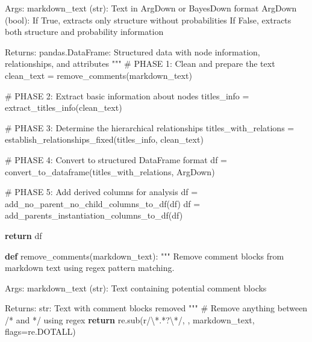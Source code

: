 \documentclass[
  11pt,
  letterpaper,
]{book}
\newenvironment{Shaded}{\begin{snugshade}}{\end{snugshade}}
\newcommand{\CharTok}[1]{\textcolor[rgb]{0.13,0.47,0.30}{#1}}
\newcommand{\CommentTok}[1]{\textcolor[rgb]{0.37,0.37,0.37}{#1}}
\newcommand{\ControlFlowTok}[1]{\textcolor[rgb]{0.00,0.23,0.31}{\textbf{#1}}}
\newcommand{\DecValTok}[1]{\textcolor[rgb]{0.68,0.00,0.00}{#1}}
\newcommand{\KeywordTok}[1]{\textcolor[rgb]{0.00,0.23,0.31}{\textbf{#1}}}
\newcommand{\NormalTok}[1]{\textcolor[rgb]{0.00,0.23,0.31}{#1}}
\newcommand{\OperatorTok}[1]{\textcolor[rgb]{0.37,0.37,0.37}{#1}}
\newcommand{\StringTok}[1]{\textcolor[rgb]{0.13,0.47,0.30}{#1}}
\newcommand{\VerbatimStringTok}[1]{\textcolor[rgb]{0.13,0.47,0.30}{#1}}
\begin{document}
\begin{Shaded}
\begin{Highlighting}[]
\CommentTok{    Args:}
\CommentTok{        markdown\_text (str): Text in ArgDown or BayesDown format}
\CommentTok{        ArgDown (bool): If True, extracts only structure without probabilities}
\CommentTok{                        If False, extracts both structure and probability information}

\CommentTok{    Returns:}
\CommentTok{        pandas.DataFrame: Structured data with node information, relationships, and attributes}
\CommentTok{    """}
    \CommentTok{\# PHASE 1: Clean and prepare the text}
\NormalTok{    clean\_text }\OperatorTok{=}\NormalTok{ remove\_comments(markdown\_text)}

    \CommentTok{\# PHASE 2: Extract basic information about nodes}
\NormalTok{    titles\_info }\OperatorTok{=}\NormalTok{ extract\_titles\_info(clean\_text)}

    \CommentTok{\# PHASE 3: Determine the hierarchical relationships}
\NormalTok{    titles\_with\_relations }\OperatorTok{=}\NormalTok{ establish\_relationships\_fixed(titles\_info, clean\_text)}

    \CommentTok{\# PHASE 4: Convert to structured DataFrame format}
\NormalTok{    df }\OperatorTok{=}\NormalTok{ convert\_to\_dataframe(titles\_with\_relations, ArgDown)}

    \CommentTok{\# PHASE 5: Add derived columns for analysis}
\NormalTok{    df }\OperatorTok{=}\NormalTok{ add\_no\_parent\_no\_child\_columns\_to\_df(df)}
\NormalTok{    df }\OperatorTok{=}\NormalTok{ add\_parents\_instantiation\_columns\_to\_df(df)}

    \ControlFlowTok{return}\NormalTok{ df}

\KeywordTok{def}\NormalTok{ remove\_comments(markdown\_text):}
    \CommentTok{"""}
\CommentTok{    Remove comment blocks from markdown text using regex pattern matching.}

\CommentTok{    Args:}
\CommentTok{        markdown\_text (str): Text containing potential comment blocks}

\CommentTok{    Returns:}
\CommentTok{        str: Text with comment blocks removed}
\CommentTok{    """}
    \CommentTok{\# Remove anything between /* and */ using regex}
    \ControlFlowTok{return}\NormalTok{ re.sub(}\VerbatimStringTok{r\textquotesingle{}/}\CharTok{\textbackslash{}*}\DecValTok{.}\OperatorTok{*?}\CharTok{\textbackslash{}*}\VerbatimStringTok{/\textquotesingle{}}\NormalTok{, }\StringTok{\textquotesingle{}\textquotesingle{}}\NormalTok{, markdown\_text, flags}\OperatorTok{=}\NormalTok{re.DOTALL)}


\end{Highlighting}
\end{Shaded}
\end{document}
